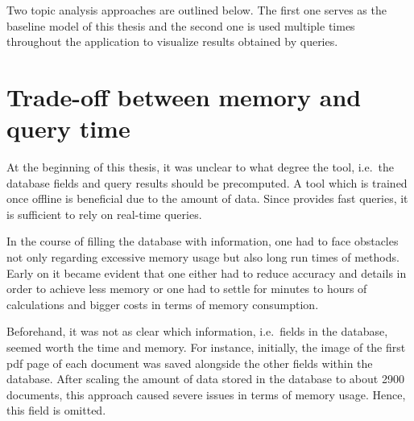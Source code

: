 Two topic analysis approaches are outlined below.
The first one serves as the baseline model of this thesis and 
the second one is used multiple times throughout the application to visualize results obtained by queries.










\section{Trade-off between memory and query time}\label{sec:trade-off}

At the beginning of this thesis, it was unclear to what degree the tool, 
i.e.\ the database fields and query results should be precomputed.
A tool which is trained once offline is beneficial due to the amount of data.
Since \databaseName{} provides fast queries, it is sufficient to rely on real-time queries.

In the course of filling the database with information, 
one had to face obstacles not only regarding excessive memory usage but also long run times of methods.
Early on it became evident that one either had to reduce accuracy and details in order to achieve less memory or 
one had to settle for minutes to hours of calculations and bigger costs in terms of memory consumption.

Beforehand, it was not as clear which information, i.e.\ fields in the database, seemed worth the time and memory.
For instance, initially, the image of the first \ac{pdf} page of each document was saved alongside the other fields within the database.
After scaling the amount of data stored in the database to about 2900 documents, 
this approach caused severe issues in terms of memory usage.
Hence, this field is omitted.